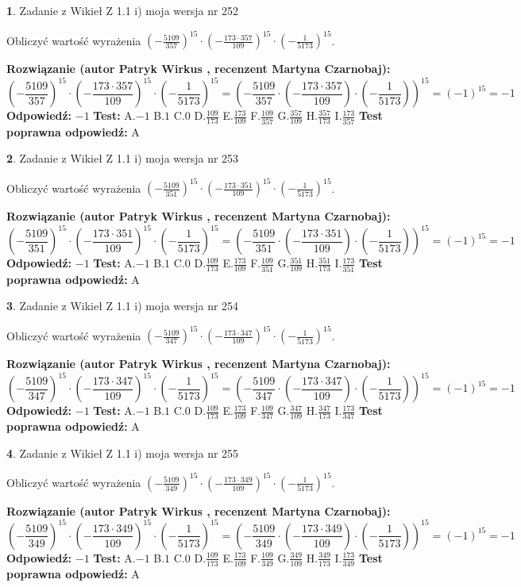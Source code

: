 \documentclass[12pt, a4paper]{article}
\theoremstyle{definition} %
\newtheorem{zad}{}
\newcommand{\zadStart}[1]{\begin{zad}#1\newline}
\newcommand{\zadStop}{\end{zad}}
\newcommand{\rozwStart}[2]{\noindent \textbf{Rozwiązanie (autor #1 , recenzent #2): }\newline}
\newcommand{\rozwStop}{\newline}
\newcommand{\odpStart}{\noindent \textbf{Odpowiedź:}\newline}
\newcommand{\odpStop}{\newline}
\newcommand{\testStart}{\noindent \textbf{Test:}\newline}
\newcommand{\testStop}{\newline}
\newcommand{\kluczStart}{\noindent \textbf{Test poprawna odpowiedź:}\newline}
\newcommand{\kluczStop}{\newline}
\begin{document}
\zadStart{Zadanie z Wikieł Z 1.1 i) moja wersja nr 252}

Obliczyć wartość wyrażenia $(-\frac{5109}{357})^{15} \cdot (-\frac{173 \cdot 357}{109})^{15} \cdot (-\frac{1}{5173})^{15}$.
\zadStop
\rozwStart{Patryk Wirkus}{Martyna Czarnobaj}
$$(-\frac{5109}{357})^{15} \cdot (-\frac{173 \cdot 357}{109})^{15} \cdot (-\frac{1}{5173})^{15} = (-\frac{5109}{357} \cdot (-\frac{173 \cdot 357}{109}) \cdot (-\frac{1}{5173}))^{15} = (-1)^{15} = -1$$
\rozwStop
\odpStart
$-1$
\odpStop
\testStart
A.$-1$ B.$1$ C.$0$ D.$\frac{109}{173}$ E.$\frac{173}{109}$
F.$\frac{109}{357}$ G.$\frac{357}{109}$
H.$\frac{357}{173}$
I.$\frac{173}{357}$
\testStop
\kluczStart
A
\kluczStop



\zadStart{Zadanie z Wikieł Z 1.1 i) moja wersja nr 253}

Obliczyć wartość wyrażenia $(-\frac{5109}{351})^{15} \cdot (-\frac{173 \cdot 351}{109})^{15} \cdot (-\frac{1}{5173})^{15}$.
\zadStop
\rozwStart{Patryk Wirkus}{Martyna Czarnobaj}
$$(-\frac{5109}{351})^{15} \cdot (-\frac{173 \cdot 351}{109})^{15} \cdot (-\frac{1}{5173})^{15} = (-\frac{5109}{351} \cdot (-\frac{173 \cdot 351}{109}) \cdot (-\frac{1}{5173}))^{15} = (-1)^{15} = -1$$
\rozwStop
\odpStart
$-1$
\odpStop
\testStart
A.$-1$ B.$1$ C.$0$ D.$\frac{109}{173}$ E.$\frac{173}{109}$
F.$\frac{109}{351}$ G.$\frac{351}{109}$
H.$\frac{351}{173}$
I.$\frac{173}{351}$
\testStop
\kluczStart
A
\kluczStop



\zadStart{Zadanie z Wikieł Z 1.1 i) moja wersja nr 254}

Obliczyć wartość wyrażenia $(-\frac{5109}{347})^{15} \cdot (-\frac{173 \cdot 347}{109})^{15} \cdot (-\frac{1}{5173})^{15}$.
\zadStop
\rozwStart{Patryk Wirkus}{Martyna Czarnobaj}
$$(-\frac{5109}{347})^{15} \cdot (-\frac{173 \cdot 347}{109})^{15} \cdot (-\frac{1}{5173})^{15} = (-\frac{5109}{347} \cdot (-\frac{173 \cdot 347}{109}) \cdot (-\frac{1}{5173}))^{15} = (-1)^{15} = -1$$
\rozwStop
\odpStart
$-1$
\odpStop
\testStart
A.$-1$ B.$1$ C.$0$ D.$\frac{109}{173}$ E.$\frac{173}{109}$
F.$\frac{109}{347}$ G.$\frac{347}{109}$
H.$\frac{347}{173}$
I.$\frac{173}{347}$
\testStop
\kluczStart
A
\kluczStop



\zadStart{Zadanie z Wikieł Z 1.1 i) moja wersja nr 255}

Obliczyć wartość wyrażenia $(-\frac{5109}{349})^{15} \cdot (-\frac{173 \cdot 349}{109})^{15} \cdot (-\frac{1}{5173})^{15}$.
\zadStop
\rozwStart{Patryk Wirkus}{Martyna Czarnobaj}
$$(-\frac{5109}{349})^{15} \cdot (-\frac{173 \cdot 349}{109})^{15} \cdot (-\frac{1}{5173})^{15} = (-\frac{5109}{349} \cdot (-\frac{173 \cdot 349}{109}) \cdot (-\frac{1}{5173}))^{15} = (-1)^{15} = -1$$
\rozwStop
\odpStart
$-1$
\odpStop
\testStart
A.$-1$ B.$1$ C.$0$ D.$\frac{109}{173}$ E.$\frac{173}{109}$
F.$\frac{109}{349}$ G.$\frac{349}{109}$
H.$\frac{349}{173}$
I.$\frac{173}{349}$
\testStop
\kluczStart
A
\kluczStop
\end{document}
